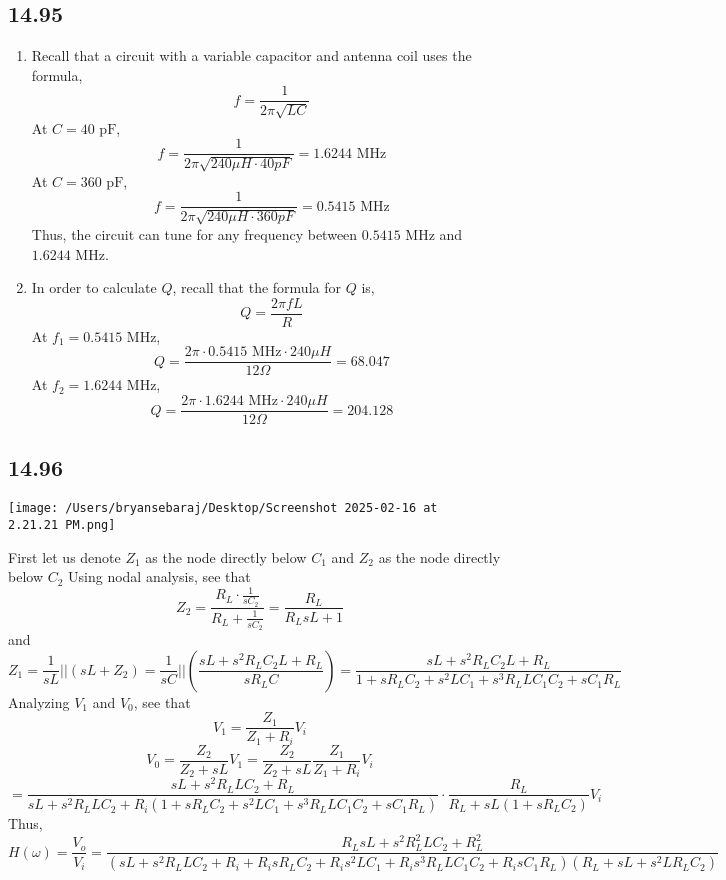 \documentclass{article}
\begin{document}
\subsection*{14.95}

\begin{enumerate}[label=(\alph*)]
    \item Recall that a circuit with a variable capacitor and antenna coil uses the formula, 
        $$f=\frac{1}{2\pi \sqrt{LC}}$$
        At $C=40 \text{ pF}$, $$f=\frac{1}{2\pi \sqrt{240 \mu H \cdot 40 pF}}=1.6244 \text{ MHz}$$
        At $C=360 \text{ pF}$, $$f=\frac{1}{2\pi \sqrt{240 \mu H \cdot 360 pF}}=0.5415 \text{ MHz}$$
        Thus, the circuit can tune for any frequency between $0.5415 \text{ MHz}$ and $1.6244 \text{ MHz}$.
    \item In order to calculate $Q$, recall that the formula for $Q$ is,
        $$Q=\frac{2\pi f L}{R}$$
        At $f_1=0.5415 \text{ MHz}$, $$Q=\frac{2\pi \cdot 0.5415 \text{ MHz} \cdot 240 \mu H}{12 \Omega}=68.047$$
        At $f_2=1.6244 \text{ MHz}$, $$Q=\frac{2\pi \cdot 1.6244 \text{ MHz} \cdot 240 \mu H}{12 \Omega}=204.128$$

\end{enumerate}


\subsection*{14.96}
\texttt{[image: /Users/bryansebaraj/Desktop/Screenshot 2025-02-16 at 2.21.21 PM.png]}

First let us denote $Z_1$ as the node directly below $C_1$ and $Z_2$ as the node directly below $C_2$ Using nodal analysis, see that $$Z_2=\frac{R_L\cdot \frac{1}{sC_2}}{R_L + \frac{1}{sC_2}}=\frac{R_L}{R_LsL + 1}$$ and
$$Z_1=\frac{1}{sL} || (sL + Z_2)=\frac{1}{sC} || \left( \frac{sL + s^2R_LC_2L + R_L}{sR_LC}\right)=\frac{sL+s^2R_LC_2L+R_L}{1 + sR_LC_2 + s^2LC_1 + s^3R_LLC_1C_2 + sC_1R_L}$$
Analyzing $V_1$ and $V_0$, see that $$V_1 = \frac{Z_1}{Z_1 + R_i}V_i$$
$$V_0 = \frac{Z_2}{Z_2 + sL}V_1=\frac{Z_2}{Z_2 + sL} \frac{Z_1}{Z_1 + R_i}V_i$$
$$=\frac{sL + s^2R_LLC_2+R_L}{sL + s^2R_LLC_2 + R_i(1 + sR_LC_2 + s^2LC_1 + s^3R_LLC_1C_2 + sC_1R_L)} \cdot \frac{R_L}{R_L + sL(1 + sR_LC_2)}V_i$$
Thus, $$H(\omega)=\frac{V_o}{V_i}=\frac{R_LsL + s^2R_L^2LC_2+R_L^2}{(sL + s^2R_LLC_2 + R_i + R_isR_LC_2 + R_is^2LC_1 + R_is^3R_LLC_1C_2 + R_isC_1R_L)(R_L + sL + s^2LR_LC_2)}$$
\end{document}
